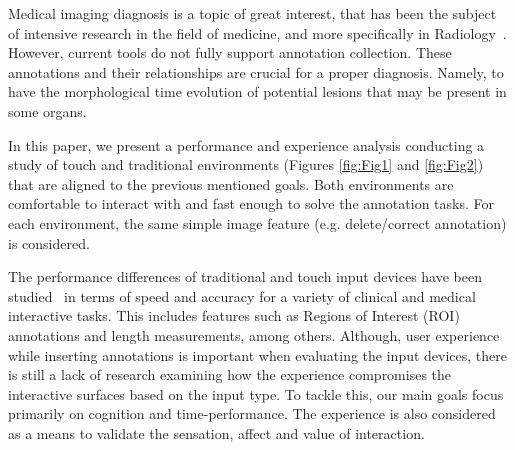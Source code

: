 \documentclass{chi-ext}
\begin{document}

Medical imaging diagnosis is a topic of great interest, that has been the subject of intensive research in the field of medicine, and more specifically in Radiology~\cite{doi2007computer, seibel2005medical, doi2005current}. However, current tools do not fully support annotation collection. These annotations and their relationships are crucial for a proper diagnosis. Namely, to have the morphological time evolution of potential lesions that may be present in some organs.

In this paper, we present a performance and experience analysis conducting a study of touch and traditional environments (Figures \ref{fig:Fig1} and \ref{fig:Fig2}) that are aligned to the previous mentioned goals. Both environments are  comfortable to interact with and fast enough to solve the annotation tasks. For each environment, the same simple image feature (e.g. delete/correct annotation) is considered.

The performance differences of traditional and touch input devices have been studied~\cite{watson2013deconstructing} in terms of speed and accuracy for a variety of clinical and medical interactive tasks. This includes features such as Regions of Interest (ROI) annotations and length measurements, among others. Although, user experience while inserting annotations is important when evaluating the input devices, there is still a lack of research examining how the experience compromises the interactive surfaces based on the input type. To tackle this, our main goals focus primarily on cognition and time-performance. The experience is also considered as a means to validate the sensation, affect and value of  interaction.
\end{document}
